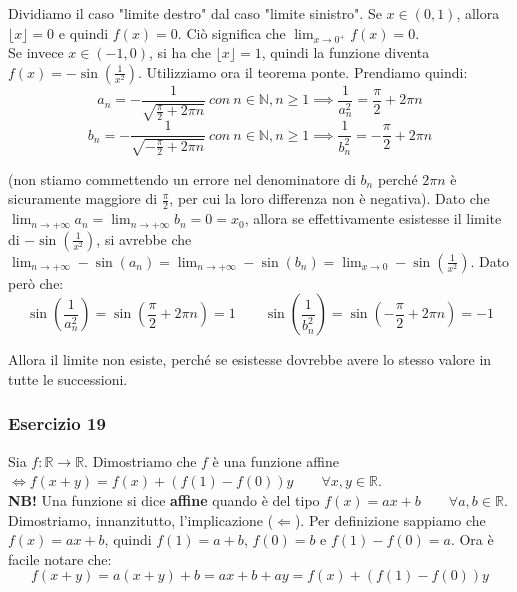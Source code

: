 \documentclass{article}
\begin{document}
\noindent Dividiamo il caso "limite destro" dal caso "limite sinistro". Se $x \in (0, 1)$, allora $\lfloor x \rfloor = 0$ e quindi $f(x) = 0$. Ciò significa che $\lim_{x \to 0^+} f(x) = 0$.\\
Se invece $x \in (-1, 0)$, si ha che $\lfloor x \rfloor = 1$, quindi la funzione diventa $f(x) = -\sin(\frac{1}{x^2})$. Utilizziamo ora il teorema ponte. Prendiamo quindi:
\begin{equation*}
    a_n = - \frac{1}{\sqrt{\frac{\pi}{2} + 2\pi n}} \ con \ n \in \mathbb{N}, n \geq 1 \implies \frac{1}{a_n^2} = \frac{\pi}{2} + 2\pi n
\end{equation*}
\begin{equation*}
    b_n = - \frac{1}{\sqrt{-\frac{\pi}{2} + 2\pi n}} \ con \ n \in \mathbb{N}, n \geq 1 \implies \frac{1}{b_n^2} = - \frac{\pi}{2} + 2\pi n
\end{equation*}

\noindent (non stiamo commettendo un errore nel denominatore di $b_n$ perché $2 \pi n$ è sicuramente maggiore di $\frac{\pi}{2}$, per cui la loro differenza non è negativa). Dato che $\lim_{n \to +\infty} a_n = \lim_{n \to +\infty} b_n = 0 = x_0$, allora se effettivamente esistesse il limite di $-\sin(\frac{1}{x^2})$, si avrebbe che $\lim_{n \to +\infty} -\sin(a_n) = \lim_{n \to +\infty} -\sin(b_n) = \lim_{x \to 0} -\sin(\frac{1}{x^2})$. Dato però che:
\begin{equation*}
    \sin\left(\frac{1}{a_n^2}\right) = \sin\left(\frac{\pi}{2} + 2\pi n\right) = 1 \qquad \sin\left(\frac{1}{b_n^2}\right) = \sin\left(-\frac{\pi}{2} + 2\pi n\right) = -1
\end{equation*}

\noindent Allora il limite non esiste, perché se esistesse dovrebbe avere lo stesso valore in tutte le successioni.

\subsubsection{Esercizio 19}
Sia $f: \mathbb{R} \xrightarrow{} \mathbb{R}$. Dimostriamo che $f$ è una funzione affine $\iff f(x + y) = f(x) + (f(1) - f(0))y \qquad \forall x, y \in \mathbb{R}$.\\

\noindent\textbf{NB!} Una funzione si dice \textbf{affine} quando è del tipo $f(x) = ax + b \qquad \forall a, b \in \mathbb{R}$.\\

\noindent Dimostriamo, innanzitutto, l'implicazione ($\Leftarrow$). Per definizione sappiamo che $f(x) = ax + b$, quindi $f(1) = a + b$, $f(0) = b$ e $f(1) - f(0) = a$. Ora è facile notare che:
\begin{equation*}
    f(x + y) = a(x + y) + b = ax + b + ay = f(x) + (f(1) - f(0))y
\end{equation*}
\end{document}
